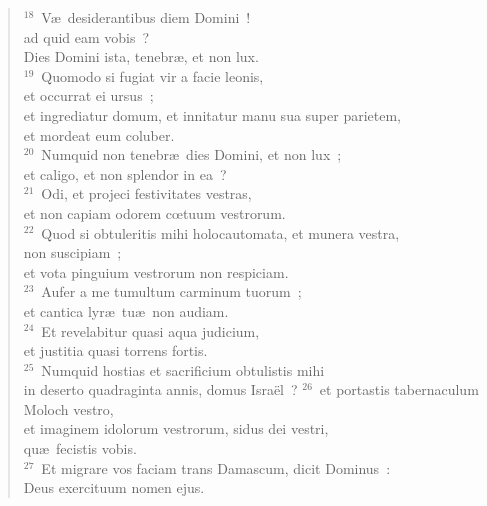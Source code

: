 \begin{verse}${}^{18}$~V\ae\ desiderantibus diem Domini~!\\ ad quid eam vobis~?\\ Dies Domini ista, tenebr\ae , et non lux.\\
${}^{19}$~Quomodo si fugiat vir a facie leonis,\\ et occurrat ei ursus~;\\ et ingrediatur domum, et innitatur manu sua super parietem,\\ et mordeat eum coluber.\\
${}^{20}$~Numquid non tenebr\ae\ dies Domini, et non lux~;\\ et caligo, et non splendor in ea~?\\
${}^{21}$~Odi, et projeci festivitates vestras,\\ et non capiam odorem cœtuum vestrorum.\\
${}^{22}$~Quod si obtuleritis mihi holocautomata, et munera vestra,\\ non suscipiam~;\\ et vota pinguium vestrorum non respiciam.\\
${}^{23}$~Aufer a me tumultum carminum tuorum~;\\ et cantica lyr\ae\ tu\ae\ non audiam.\\
${}^{24}$~Et revelabitur quasi aqua judicium,\\ et justitia quasi torrens fortis.\\
${}^{25}$~Numquid hostias et sacrificium obtulistis mihi\\ in deserto quadraginta annis, domus Isra\"el~?
${}^{26}$~et portastis tabernaculum Moloch vestro,\\ et imaginem idolorum vestrorum, sidus dei vestri,\\ qu\ae\ fecistis vobis.\\
${}^{27}$~Et migrare vos faciam trans Damascum, dicit Dominus~:\\ Deus exercituum nomen ejus.\end{verse}


